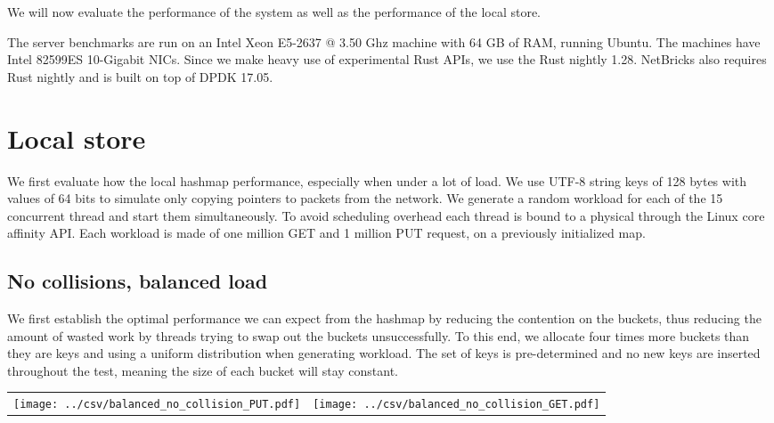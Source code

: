 \label{chap:evaluation}

We will now evaluate the performance of the system as well as the
performance of the local store.

The server benchmarks are run on an Intel Xeon E5-2637 @ 3.50 Ghz
machine with 64 GB of RAM, running Ubuntu. The machines have Intel
82599ES 10-Gigabit NICs. Since we make heavy use of experimental Rust
APIs, we use the Rust nightly 1.28. NetBricks also requires Rust
nightly and is built on top of DPDK 17.05.

\section{Local store}
\label{sec:eval-local}

We first evaluate how the local hashmap performance, especially when
under a lot of load. We use UTF-8 string keys of 128 bytes with values
of 64 bits to simulate only copying pointers to packets from the
network. We generate a random workload for each of the 15 concurrent
thread and start them simultaneously. To avoid scheduling overhead
each thread is bound to a physical through the Linux core affinity
API\@. Each workload is made of one million GET and 1 million PUT
request, on a previously initialized map.

\subsection{No collisions, balanced load}

We first establish the optimal performance we can expect from the
hashmap by reducing the contention on the buckets, thus reducing the
amount of wasted work by threads trying to swap out the buckets
unsuccessfully. To this end, we allocate four times more buckets than
they are keys and using a uniform distribution when generating
workload. The set of keys is pre-determined and no new keys are
inserted throughout the test, meaning the size of each bucket will
stay constant.

\begin{center}
  \begin{tabular}{c c} \label{table:nocol-balanced}
    \texttt{[image: ../csv/balanced\_no\_collision\_PUT.pdf]}
    &
      \texttt{[image: ../csv/balanced\_no\_collision\_GET.pdf]}
  \end{tabular}
\end{center}

